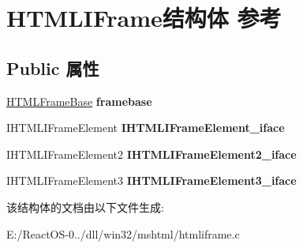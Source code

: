 \hypertarget{struct_h_t_m_l_i_frame}{}\section{H\+T\+M\+L\+I\+Frame结构体 参考}
\label{struct_h_t_m_l_i_frame}
\subsection*{Public 属性}
\begin{DoxyCompactItemize}
\item 
\mbox{\label{struct_h_t_m_l_i_frame_ad69b938482291daa8b169544e794aa13}} 
\hyperlink{struct_h_t_m_l_frame_base}{H\+T\+M\+L\+Frame\+Base} {\bfseries framebase}
\item 
\mbox{\label{struct_h_t_m_l_i_frame_a6ef447cf0ffa23b62245b4362d41121e}} 
I\+H\+T\+M\+L\+I\+Frame\+Element {\bfseries I\+H\+T\+M\+L\+I\+Frame\+Element\+\_\+iface}
\item 
\mbox{\label{struct_h_t_m_l_i_frame_a0b0646411778f63723c2dbd034b7c9fa}} 
I\+H\+T\+M\+L\+I\+Frame\+Element2 {\bfseries I\+H\+T\+M\+L\+I\+Frame\+Element2\+\_\+iface}
\item 
\mbox{\label{struct_h_t_m_l_i_frame_a8715fefd11e2419e30931bf56a68ebb8}} 
I\+H\+T\+M\+L\+I\+Frame\+Element3 {\bfseries I\+H\+T\+M\+L\+I\+Frame\+Element3\+\_\+iface}
\end{DoxyCompactItemize}


该结构体的文档由以下文件生成\+:\begin{DoxyCompactItemize}
\item 
E\+:/\+React\+O\+S-\/0../dll/win32/mshtml/htmliframe.\+c\end{DoxyCompactItemize}
